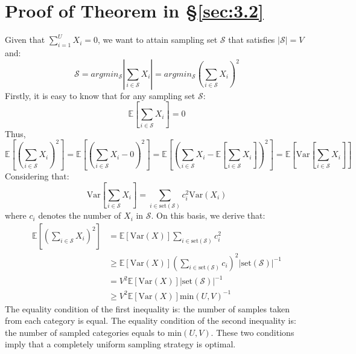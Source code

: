 \section{Proof of Theorem in \S\ref{sec:3.2}}
\label{app:proof}
Given that $\sum_{i=1}^U X_i = 0$, we want to attain sampling set $\mathcal{S}$ that satisfies $|\mathcal{S}|=V$ and:
\begin{equation}
    \mathcal{S} = argmin_{\mathcal{S}} | \sum\limits_{i \in \mathcal{S}} X_i | = argmin_{\mathcal{S}} (\sum\limits_{i \in \mathcal{S}} X_i )^2
    \label{eq-ap:1}
\end{equation}
Firstly, it is easy to know that for any sampling set $\mathcal{S}$:
\begin{equation}
    \mathbb{E}[ \sum\limits_{i \in \mathcal{S}} X_i ]=0
    \label{eq-ap:2}
\end{equation}
Thus, 
\begin{equation}
    \mathbb{E}[(\sum\limits_{i \in \mathcal{S}} X_i)^2] = 
    \mathbb{E}[(\sum\limits_{i \in \mathcal{S}} X_i-0)^2] =
    \mathbb{E}[(\sum\limits_{i \in \mathcal{S}} X_i-\mathbb{E}[ \sum\limits_{i \in \mathcal{S}} X_i ])^2] =\mathbb{E}[  \mathrm{Var}[ \sum\limits_{i \in \mathcal{S}} X_i ] ]
    \label{eq-ap:3}
\end{equation}
Considering that:
\begin{equation}
    \mathrm{Var}[ \sum\limits_{i \in \mathcal{S}} X_i ] =  \sum\limits_{i \in \mathrm{set}(\mathcal{S})} c_i^2\mathrm{Var}(X_i)
    \label{eq-ap:4}
\end{equation}
where $c_i$ denotes the number of $X_i$ in $\mathcal{S}$. On this basis, we derive that:
\begin{equation}
\begin{aligned}
    \mathbb{E}[(\sum\limits_{i \in \mathcal{S}} X_i)^2] &= \mathbb{E}[\mathrm{Var}(X)]\sum\limits_{i \in \mathrm{set}(\mathcal{S})} c_i^2\\
&\geq \mathbb{E}[\mathrm{Var}(X)](\sum\limits_{i \in \mathrm{set}(\mathcal{S})} c_i)^2 |\mathrm{set}(\mathcal{S})|^{-1}\\
&=V^2\mathbb{E}[\mathrm{Var}(X)] |\mathrm{set}(\mathcal{S})|^{-1} \\
&\geq V^2\mathbb{E}[\mathrm{Var}(X)]\mathrm{min}(U,V)^{-1}
\end{aligned}
\label{eq-ap:5}
\end{equation}
The equality condition of the first inequality is: the number of samples taken from each category is equal. The equality condition of the second inequality is: the number of sampled categories equals to $\mathrm{min}(U,V)$. These two conditions imply that a completely uniform sampling strategy is optimal.

